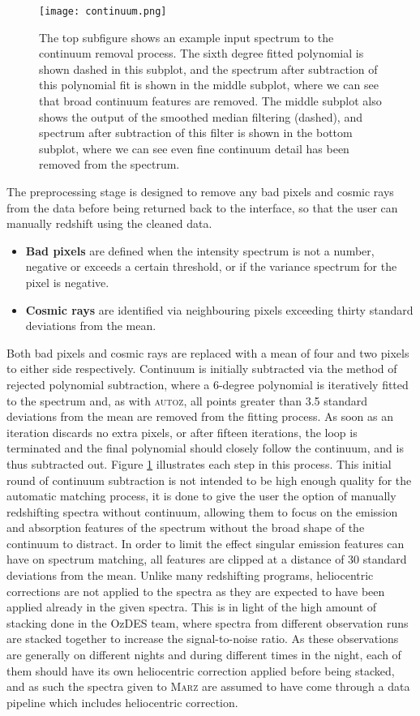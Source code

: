 \documentclass[iop]{emulateapj}
\newcommand{\autoz}{\textsc{autoz}}
\newcommand{\marz}{\textsc{Marz}}
\begin{document}
\begin{figure}[t]
\centering
\texttt{[image: continuum.png]}
\caption{The top subfigure shows an example input spectrum to the continuum removal process. The sixth degree fitted polynomial is shown dashed in this subplot, and the spectrum after subtraction of this polynomial fit is shown in the middle subplot, where we can see that broad continuum features are removed. The middle subplot also shows the output of the smoothed median filtering (dashed), and spectrum after subtraction of this filter is shown in the bottom subplot, where we can see even fine continuum detail has been removed from the spectrum.}
\label{fig:continuum}
\end{figure}


The preprocessing stage is designed to remove any bad pixels and cosmic rays from the data before being returned back to the interface, so that the user can manually redshift using the cleaned data.
\begin{itemize}
\item \textbf{Bad pixels} are defined when the intensity spectrum is not a number, negative or exceeds a certain threshold, or if the variance spectrum for the pixel is negative.
\item \textbf{Cosmic rays} are identified via neighbouring pixels exceeding thirty standard deviations from the mean.
\end{itemize}
Both bad pixels and cosmic rays are replaced with a mean of four and two pixels to either side respectively. Continuum is initially subtracted via the method of rejected polynomial subtraction, where a 6-degree polynomial is iteratively fitted to the spectrum and, as with \autoz{}, all points greater than 3.5 standard deviations from the mean are removed from the fitting process. As soon as an iteration discards no extra pixels, or after fifteen iterations, the loop is terminated and the final polynomial should closely follow the continuum, and is thus subtracted out. Figure \ref{fig:continuum} illustrates each step in this process. This initial round of continuum subtraction is not intended to be high enough quality for the automatic matching process, it is done to give the user the option of manually redshifting spectra without continuum, allowing them to focus on the emission and absorption features of the spectrum without the broad shape of the continuum to distract. In order to limit the effect singular emission features can have on spectrum matching, all features are clipped at a distance of 30 standard deviations from the mean. Unlike many redshifting programs, heliocentric corrections are not applied to the spectra as they are expected to have been applied already in the given spectra. This is in light of the high amount of stacking done in the OzDES team, where spectra from different observation runs are stacked together to increase the signal-to-noise ratio. As these observations are generally on different nights and during different times in the night, each of them should have its own heliocentric correction applied before being stacked, and as such the spectra given to \marz{} are assumed to have come through a data pipeline which includes heliocentric correction.\\
\end{document}
